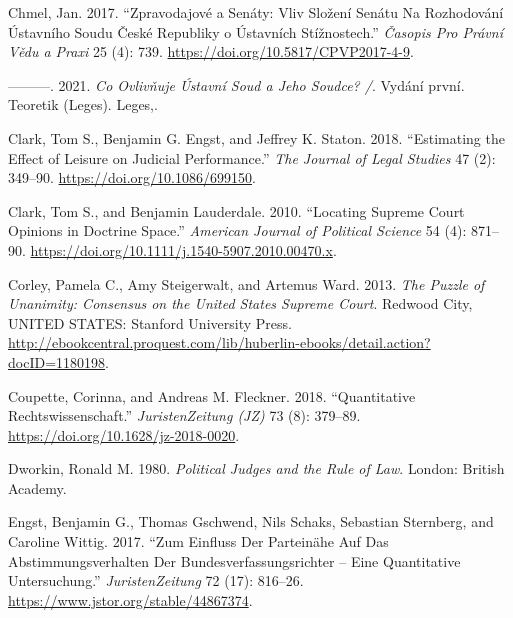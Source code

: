 \documentclass[
  11pt,
]{article}
\newlength{\cslhangindent}
\newenvironment{CSLReferences}[2] %
 {%
  \setlength{\parindent}{0pt}
  \ifodd #1 \everypar{\setlength{\hangindent}{\cslhangindent}}\ignorespaces\fi
  \ifnum #2 > 0
  \setlength{\parskip}{#2\baselineskip}
  \fi
 }%
 {}
\begin{document}
\begin{CSLReferences}{1}{0}
\leavevmode{}%
Chmel, Jan. 2017. {``Zpravodajové a Senáty: {Vliv} Složení Senátu Na
Rozhodování {Ústavního} Soudu {České} Republiky o Ústavních
Stížnostech.''} \emph{Časopis Pro Právní Vědu a Praxi} 25 (4): 739.
\url{https://doi.org/10.5817/CPVP2017-4-9}.

\leavevmode{}%
---------. 2021. \emph{Co Ovlivňuje {Ústavní} Soud a Jeho Soudce? /}.
Vydání první. Teoretik ({Leges}). {Leges,}.

\leavevmode{}%
Clark, Tom S., Benjamin G. Engst, and Jeffrey K. Staton. 2018.
{``Estimating the {Effect} of {Leisure} on {Judicial Performance}.''}
\emph{The Journal of Legal Studies} 47 (2): 349--90.
\url{https://doi.org/10.1086/699150}.

\leavevmode{}%
Clark, Tom S., and Benjamin Lauderdale. 2010. {``Locating {Supreme Court
Opinions} in {Doctrine Space}.''} \emph{American Journal of Political
Science} 54 (4): 871--90.
\url{https://doi.org/10.1111/j.1540-5907.2010.00470.x}.

\leavevmode{}%
Corley, Pamela C., Amy Steigerwalt, and Artemus Ward. 2013. \emph{The
{Puzzle} of {Unanimity}: {Consensus} on the {United States Supreme
Court}}. {Redwood City, UNITED STATES}: {Stanford University Press}.
\url{http://ebookcentral.proquest.com/lib/huberlin-ebooks/detail.action?docID=1180198}.

\leavevmode{}%
Coupette, Corinna, and Andreas M. Fleckner. 2018. {``Quantitative
{Rechtswissenschaft}.''} \emph{JuristenZeitung (JZ)} 73 (8): 379--89.
\url{https://doi.org/10.1628/jz-2018-0020}.

\leavevmode{}%
Dworkin, Ronald M. 1980. \emph{Political Judges and the Rule of Law}.
{London}: {British Academy}.

\leavevmode{}%
Engst, Benjamin G., Thomas Gschwend, Nils Schaks, Sebastian Sternberg,
and Caroline Wittig. 2017. {``Zum {Einfluss} Der {Parteinähe} Auf Das
{Abstimmungsverhalten} Der {Bundesverfassungsrichter} -- Eine
Quantitative {Untersuchung}.''} \emph{JuristenZeitung} 72 (17): 816--26.
\url{https://www.jstor.org/stable/44867374}.


\end{CSLReferences}
\end{document}
